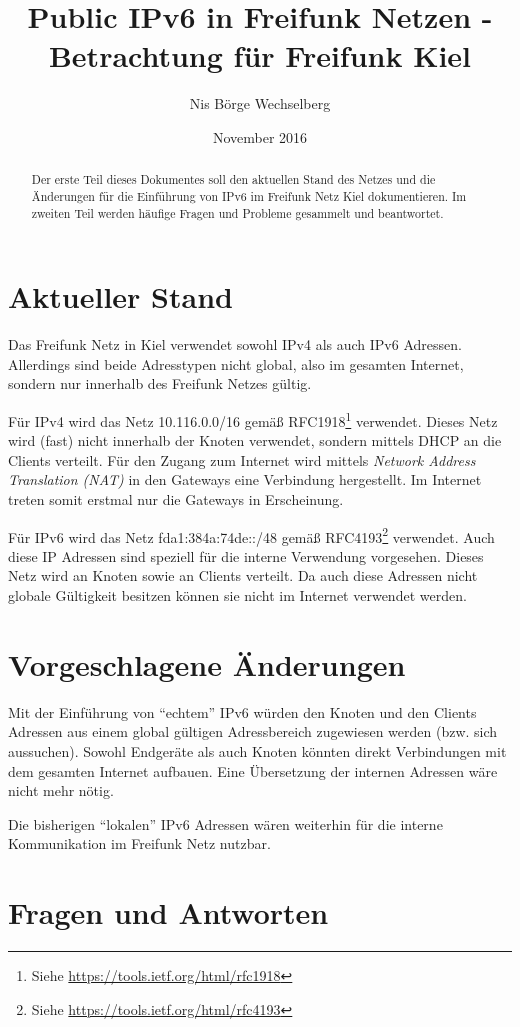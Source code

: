 \documentclass[10pt,a4paper,oneside]{scrartcl}
\title{Public IPv6 in Freifunk Netzen - Betrachtung für Freifunk Kiel}
\author{Nis Börge Wechselberg}
\date{November 2016}
\begin{document}
\maketitle

\begin{abstract}
Der erste Teil dieses Dokumentes soll den aktuellen Stand des Netzes
und die Änderungen für die Einführung von IPv6 im Freifunk Netz Kiel
dokumentieren. Im zweiten Teil werden häufige Fragen und Probleme gesammelt
und beantwortet.
\end{abstract}

\section{Aktueller Stand}
Das Freifunk Netz in Kiel verwendet sowohl IPv4 als auch IPv6 Adressen.
Allerdings sind beide Adresstypen nicht global, also im gesamten Internet,
sondern nur innerhalb des Freifunk Netzes gültig.

Für IPv4 wird das Netz 10.116.0.0/16 gemäß RFC1918\footnote{Siehe \url{https://tools.ietf.org/html/rfc1918}} verwendet.
Dieses Netz wird (fast) nicht innerhalb der Knoten verwendet, sondern mittels DHCP an die Clients verteilt.
Für den Zugang zum Internet wird mittels \emph{Network Address Translation (NAT)} in den Gateways eine Verbindung hergestellt.
Im Internet treten somit erstmal nur die Gateways in Erscheinung.

Für IPv6 wird das Netz fda1:384a:74de::/48 gemäß RFC4193\footnote{Siehe \url{https://tools.ietf.org/html/rfc4193}} verwendet.
Auch diese IP Adressen sind speziell für die interne Verwendung vorgesehen. Dieses Netz wird an Knoten sowie an Clients verteilt.
Da auch diese Adressen nicht globale Gültigkeit besitzen können sie nicht im Internet verwendet werden.

\section{Vorgeschlagene Änderungen}
Mit der Einführung von ``echtem'' IPv6 würden den Knoten und den Clients
Adressen aus einem global gültigen Adressbereich zugewiesen werden (bzw. sich aussuchen).
Sowohl Endgeräte als auch Knoten könnten direkt Verbindungen mit dem gesamten Internet aufbauen.
Eine Übersetzung der internen Adressen wäre nicht mehr nötig.

Die bisherigen ``lokalen'' IPv6 Adressen wären weiterhin für die interne Kommunikation im Freifunk Netz
nutzbar.

\section{Fragen und Antworten}
\end{document}

